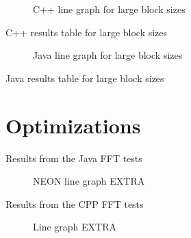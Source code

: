 \begin{figure}
    \centering
    \label{fig:cpp:line:large}
    \caption{C++ line graph for large block sizes}
    
\end{figure}
\begin{table}
    \centering
    \label{tab:cpp:large}
    \caption{C++ results table for large block sizes}
    \resizebox{\columnwidth}{!}{
        
    }
\end{table}


\begin{figure}
    \centering
    \label{fig:java:line:large}
    \caption{Java line graph for large block sizes}
    
\end{figure}
\begin{table}
    \centering
    \label{tab:java:large}
    \caption{Java results table for large block sizes}
    
\end{table}





\section{Optimizations}

\begin{table}
    \centering
    \label{tab:java:extra}
    \caption{Results from the Java FFT tests}
    \resizebox{\columnwidth}{!}{
        
    }
\end{table}

\begin{figure}
    \centering
    \caption{NEON line graph EXTRA}
    
\end{figure}

\begin{table}
    \centering
    \label{tab:cpp:extra}
    \caption{Results from the CPP FFT tests}
    \resizebox{\columnwidth}{!}{
        
    }
\end{table}

\begin{figure}
    \centering
    \caption{Line graph EXTRA}
    
\end{figure}

